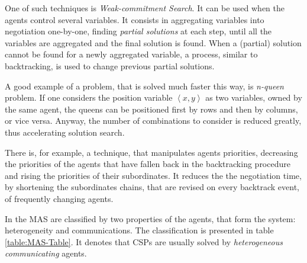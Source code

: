\documentclass[ThesisDoc]{subfiles}
\begin{document}
One of such techniques is \emph{Weak-commitment Search}\cite{Weak-commitment}.
It can be used when the agents control several variables. It consists in
aggregating variables into negotiation one-by-one, finding \emph{partial solutions}
at each step, until all the variables are aggregated and the final solution
is found. When a (partial) solution cannot be found for a newly aggregated
variable, a process, similar to backtracking, is used to change previous
partial solutions.

A good example of a problem, that is solved much faster this way, is
\emph{n-queen} problem. If one considers the position variable
$\left< x,y \right>$ as two variables, owned by the same agent, the queens
can be positioned first by rows and then by columns, or vice versa. Anyway,
the number of combinations to consider is reduced greatly, thus accelerating
solution search.

There is, for example, a technique, that manipulates agents priorities,
decreasing the priorities of the agents that have fallen back in the backtracking
procedure and rising the priorities of their subordinates. It reduces the
the negotiation time, by shortening the subordinates chains, that are
revised on every backtrack event, of frequently changing agents.

\bigskip

\noindent
In \cite{MAS-Survey} the MAS are classified by two properties of the agents,
that form the system: heterogeneity and communications.
The classification is presented in table \ref{table:MAS-Table}. It denotes
that CSPs are usually solved by \emph{heterogeneous communicating} agents.
\end{document}
